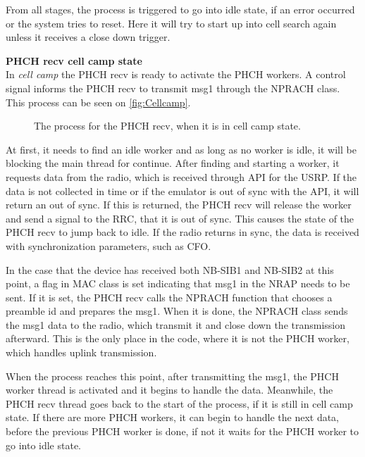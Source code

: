 From all stages, the process is triggered to go into idle state, if an error occurred or the system tries to reset. Here it will try to start up into cell search again unless it receives a close down trigger.

\textbf{PHCH recv cell camp state} \\

In \textit{cell camp} the PHCH recv is ready to activate the PHCH workers. A control signal informs the PHCH recv to transmit msg1 through the NPRACH class. This process can be seen on \autoref{fig:Cellcamp}.

\begin{figure}[H]

\centering


\resizebox{0.7\textwidth}{!}{

}

\caption{The process for the PHCH recv, when it is in cell camp state.}

\label{fig:Cellcamp}

\end{figure}

At first, it needs to find an idle worker and as long as no worker is idle, it will be blocking the main thread for continue. After finding and starting a worker, it requests data from the radio, which is received through API for the USRP. If the data is not collected in time or if the emulator is out of sync with the API, it will return an out of sync. If this is returned, the PHCH recv will release the worker and send a signal to the RRC, that it is out of sync. This causes the state of the PHCH recv to jump back to idle. If the radio returns in sync, the data is received with synchronization parameters, such as \gls{CFO}.

In the case that the device has received both NB-SIB1 and NB-SIB2 at this point, a flag in MAC class is set indicating that  msg1 in the \gls{NRAP} needs to be sent. If it is set, the PHCH recv calls the NPRACH function that chooses a  preamble id and prepares the msg1. When it is done, the NPRACH class sends the msg1 data to the radio, which transmit it and close down the transmission afterward. This is the only place in the code, where it is not the PHCH worker, which handles uplink transmission.

When the process reaches this point, after transmitting the msg1, the PHCH worker thread is activated and it begins to handle the data. Meanwhile, the PHCH recv thread goes back to the start of the process, if it is still in cell camp state. If there are more PHCH workers, it can begin to handle the next data, before the previous PHCH worker is done, if not it waits for the PHCH worker to go into idle state.

